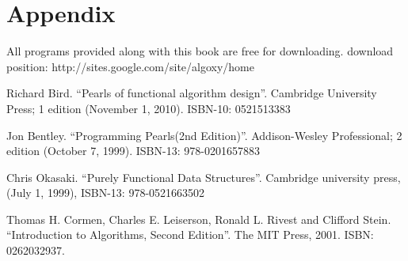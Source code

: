 \documentclass[UTF8]{article}
\begin{document}
\section{Appendix} \label{appendix}
All programs provided along with this book are free for
downloading. download position:
  http://sites.google.com/site/algoxy/home

\begin{thebibliography}{99}

Richard Bird. ``Pearls of functional algorithm design''. Cambridge University Press; 1 edition (November 1, 2010). ISBN-10: 0521513383

Jon Bentley. ``Programming Pearls(2nd Edition)''. Addison-Wesley Professional; 2 edition (October 7, 1999). ISBN-13: 978-0201657883

Chris Okasaki. ``Purely Functional Data Structures''. Cambridge university press, (July 1, 1999), ISBN-13: 978-0521663502

Thomas H. Cormen, Charles E. Leiserson, Ronald L. Rivest and Clifford Stein. ``Introduction to Algorithms, Second Edition''. The MIT Press, 2001. ISBN: 0262032937.

\end{thebibliography}

\ifx\wholebook\relax \else
\end{document}
